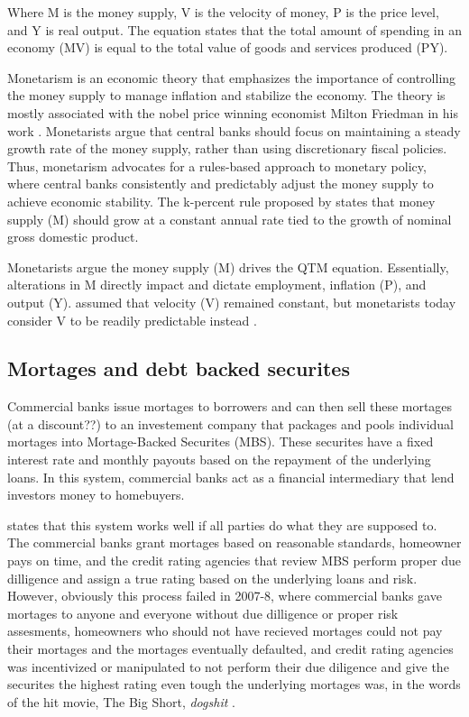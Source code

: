 Where M is the money supply, V is the velocity of money, P is the price level, and Y is real output. The equation states that the total amount of spending in an economy (MV) is equal to the total value of goods and services produced (PY).

Monetarism is an economic theory that emphasizes the importance of controlling the money supply to manage inflation and stabilize the economy. The theory is mostly associated with the nobel price winning economist Milton Friedman in his work \textcite{friedman2008monetary}. Monetarists argue that central banks should focus on maintaining a steady growth rate of the money supply, rather than using discretionary fiscal policies. Thus, monetarism advocates for a rules-based approach to monetary policy, where central banks consistently and predictably adjust the money supply to achieve economic stability. The k-percent rule proposed by \textcite{friedman2008monetary} states that money supply (M) should grow at a constant annual rate tied to the growth of nominal gross domestic product. 

Monetarists argue the money supply (M) drives the QTM equation. Essentially, alterations in M directly impact and dictate employment, inflation (P), and output (Y). \textcite{friedman2008monetary} assumed that velocity (V) remained constant, but monetarists today consider V to be readily predictable instead \cite{monetarismInvestopedia}. 


\subsection{Mortages and debt backed securites}

Commercial banks issue mortages to borrowers and can then sell these mortages (at a discount??) to an investement company that packages and pools individual mortages into Mortage-Backed Securites (MBS). These securites have a fixed interest rate and monthly payouts based on the repayment of the underlying loans. In this system, commercial banks act as a financial intermediary that lend investors money to homebuyers. 

\textcite{MBSInvestopedia} states that this system works well if all parties do what they are supposed to. The commercial banks grant mortages based on reasonable standards, homeowner pays on time, and the credit rating agencies that review MBS perform proper due dilligence and assign a true rating based on the underlying loans and risk. However, obviously this process failed in 2007-8, where commercial banks gave mortages to anyone and everyone without due dilligence or proper risk assesments, homeowners who should not have recieved mortages could not pay their mortages and the mortages eventually defaulted, and credit rating agencies was incentivized or manipulated to not perform their due diligence and give the securites the highest rating even tough the underlying mortages was, in the words of the hit movie, The Big Short, \textit{dogshit} \cite{thebigshort}.

